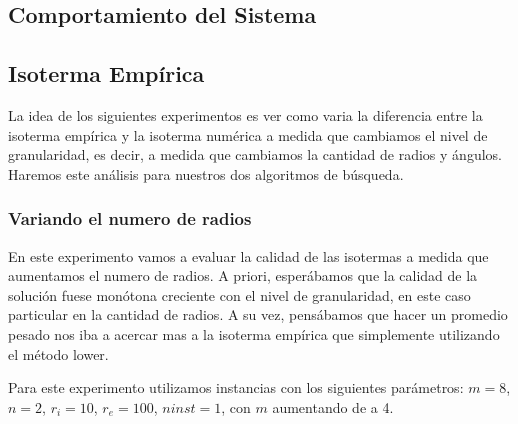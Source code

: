 \newpage
\subsection{Comportamiento del Sistema}

\subsection{Isoterma Empírica}

La idea de los siguientes experimentos es ver como varia la diferencia entre la isoterma empírica y la isoterma numérica a medida que cambiamos el nivel de granularidad, es decir, a medida que cambiamos la cantidad de radios y ángulos. Haremos este análisis para nuestros dos algoritmos de búsqueda.

\subsubsection*{Variando el numero de radios}

En este experimento vamos a evaluar la calidad de las isotermas a medida que aumentamos el numero de radios. A priori, esperábamos que la calidad de la solución fuese monótona creciente con el nivel de granularidad, en este caso particular en la cantidad de radios. A su vez, pensábamos que hacer un promedio pesado nos iba a acercar mas a la isoterma empírica que simplemente utilizando el método lower.

Para este experimento utilizamos instancias con los siguientes parámetros: $m = 8$, $n = 2$, $r_i = 10$, $r_e = 100$, $ninst = 1$, con $m$ aumentando de a 4. 

